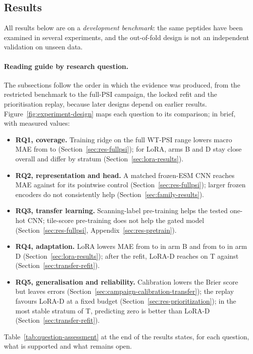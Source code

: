 \subsection{Results}\label{sec:results}
All results below are on a \emph{development benchmark}: the same \nNPep{} peptides have been examined in
several experiments, and the out-of-fold design is not an independent validation on unseen data.

\paragraph{Reading guide by research question.} The subsections follow the order in which the
evidence was produced, from the restricted benchmark to the full-PSI campaign, the locked refit and
the prioritisation replay, because later designs depend on earlier results.
Figure~\ref{fig:experiment-design} maps each question to its comparison; in brief, with measured values:
\begin{itemize}
  \item \textbf{RQ1, coverage.} Training ridge on the full WT-PSI range lowers macro MAE from
        \nVthreeRidgeB{} to \nVthreeRidgeD{} (Section~\ref{sec:res-fullpsi}); for LoRA, arms B and D stay
        close overall and differ by stratum (Section~\ref{sec:lora-results}).
  \item \textbf{RQ2, representation and head.} A matched frozen-ESM CNN reaches MAE \nVthreeCnnD{}
        against \nVthreePointwiseD{} for its pointwise control (Section~\ref{sec:res-fullpsi}); larger frozen
        encoders do not consistently help (Section~\ref{sec:family-results}).
  \item \textbf{RQ3, transfer learning.} Scanning-label pre-training helps the tested one-hot CNN; tile-score
        pre-training does not help the gated model (Section~\ref{sec:res-fullpsi}, Appendix~\ref{sec:res-pretrain}).
  \item \textbf{RQ4, adaptation.} LoRA lowers MAE from \nCampaignFrozenB{} to \nCampaignLoraB{} in arm B and
        from \nCampaignFrozenD{} to \nCampaignLoraD{} in arm D (Section~\ref{sec:lora-results}); after the
        refit, LoRA-D reaches \nTLoraMae{} on T against \nTFrozenMae{} (Section~\ref{sec:transfer-refit}).
  \item \textbf{RQ5, generalisation and reliability.} Calibration lowers the Brier score but leaves errors
        (Section~\ref{sec:campaign-calibration-transfer}); the replay favours LoRA-D at a fixed budget
        (Section~\ref{sec:res-prioritization}); in the most stable stratum of T, predicting zero is better
        than LoRA-D (Section~\ref{sec:transfer-refit}).
\end{itemize}
Table~\ref{tab:question-assessment} at the end of the results states, for each question, what is
supported and what remains open.

